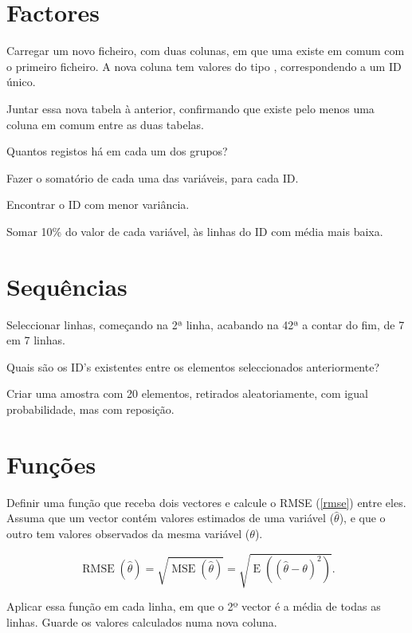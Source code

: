 \documentclass{exam}
\begin{document}
\section*{Factores}

\begin{questions}
	\question Carregar um novo ficheiro, com duas colunas, em que uma existe em comum com o primeiro ficheiro. A nova coluna tem valores do tipo , correspondendo a um ID único.
	
	\question Juntar essa nova tabela à anterior, confirmando que existe pelo menos uma coluna em comum entre as duas tabelas.
	
	\question Quantos registos há em cada um dos grupos?
	
	\question Fazer o somatório de cada uma das variáveis, para cada ID.
	
	\question Encontrar o ID com menor variância.
	
	\question Somar 10\% do valor de cada variável, às linhas do ID com média mais baixa.

\end{questions}

\section*{Sequências}

\begin{questions}
	\question Seleccionar linhas, começando na 2ª linha, acabando na 42ª a contar do fim, de 7 em 7 linhas.
	
	\question Quais são os ID's existentes entre os elementos seleccionados anteriormente?
	
	
	\question Criar uma amostra com 20 elementos, retirados aleatoriamente, com igual probabilidade, mas com reposição.
	
\end{questions}

\section*{Funções}
\begin{questions}
	\question Definir uma função que receba dois vectores e calcule o RMSE (\autoref{rmse}) entre eles. Assuma que um vector contém valores estimados de uma variável ($\hat{\theta}$), e que o outro tem valores observados da mesma variável ($\theta$).
	
	\begin{equation}
		\label{rmse}
		\operatorname{RMSE}(\hat{\theta}) = \sqrt{\operatorname{MSE}
			(\hat{\theta})} = \sqrt{\operatorname{E}((\hat{\theta}-\theta)^2)}.
	\end{equation}
	
	\question Aplicar essa função em cada linha, em que o 2º vector é a média de todas as linhas. Guarde os valores calculados numa nova coluna.

\end{questions}
\end{document}
